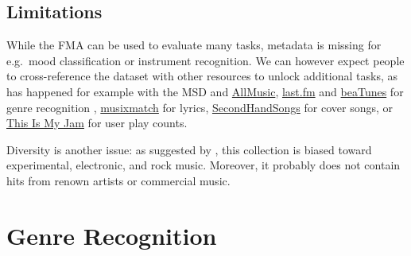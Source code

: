 \documentclass{article}
\begin{document}
\subsection{Limitations}



While the FMA can be used to evaluate many tasks, metadata is missing for e.g.\ mood classification or instrument recognition.
We can however expect people to cross-reference the dataset with other resources to unlock additional tasks, as has happened for example with the MSD and \href{http://www.allmusic.com}{AllMusic}, \href{https://www.last.fm}{last.fm} and \href{https://beatunes.com}{beaTunes} for genre recognition \cite{msd_features, msd_genres}, \href{https://musixmatch.com}{musixmatch} for lyrics, \href{https://secondhandsongs.com}{SecondHandSongs} for cover songs, or \href{https://www.thisismyjam.com}{This Is My Jam} for user play counts.

Diversity is another issue: as suggested by , this collection is biased toward experimental, electronic, and rock music. Moreover, it probably does not contain hits from renown artists or commercial music.


\section{Genre Recognition} %
\end{document}
